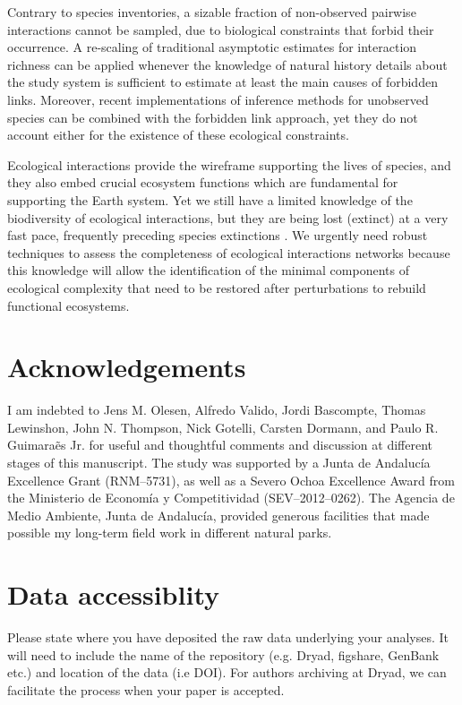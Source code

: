 \documentclass[12pt]{article}
\begin{document}
Contrary to species inventories, a sizable fraction of non-observed pairwise interactions cannot be sampled, due to biological constraints that forbid their occurrence. A re-scaling of traditional asymptotic estimates for interaction richness can be applied whenever the knowledge of natural history details about the study system is sufficient to estimate at least the main causes of forbidden links. Moreover, recent implementations of inference methods for unobserved species \citep{Chao:2015tc} can be combined with the forbidden link approach, yet they do not account either for the existence of these ecological constraints. 

Ecological interactions provide the wireframe supporting the lives of species, and they also embed crucial ecosystem functions which are fundamental for supporting the Earth system. Yet we still have a limited knowledge of the biodiversity of ecological interactions, but they are being lost (extinct) at a very fast pace, frequently preceding species extinctions \citep{ValienteBanuet:2014bw}. We urgently need robust techniques to assess the completeness of ecological interactions networks because this knowledge will allow the identification of the minimal components of ecological complexity that need to be restored after perturbations to rebuild functional ecosystems.
\section*{Acknowledgements}
\label{acknowledgements.}

I am indebted to Jens M. Olesen, Alfredo Valido, Jordi Bascompte, Thomas Lewinshon, John N. Thompson, Nick Gotelli, Carsten Dormann, and Paulo R. Guimara\~es Jr. for useful and thoughtful comments and discussion at different stages of this manuscript. The study was supported by a Junta de Andaluc\'ia Excellence Grant (RNM--5731), as well as a Severo Ochoa Excellence Award from the Ministerio de Econom\'ia y Competitividad (SEV--2012--0262). The Agencia de Medio Ambiente, Junta de Andaluc\'ia, provided generous facilities that made possible my long-term field work in different natural parks.
\section*{Data accessiblity}
Please state where you have deposited the raw data underlying your analyses. It will need to include the name of the repository (e.g. Dryad, figshare, GenBank etc.) and location of the data (i.e DOI). For authors archiving at Dryad, we can facilitate the process when your paper is accepted. \\
\newpage
\end{document}
